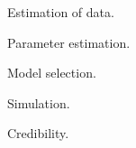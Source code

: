 \documentclass{osucourse}
\begin{document}
\CatalogDescription
\PrerequisitesAndExclusions

\begin{TopicsList}
\item Estimation of data.
\item Parameter estimation.
\item Model selection.
\item Simulation.
\item Credibility.
\end{TopicsList}
\end{document}
